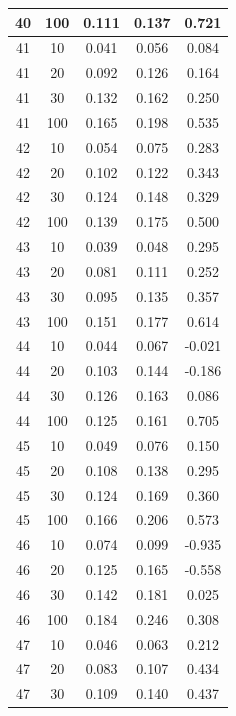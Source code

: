 \begin{longtable}{ |c|c|c|c|c| }
            40 & 100 & 0.111 & 0.137 & 0.721 \\ \hline
            41 & 10 & 0.041 & 0.056 & 0.084 \\ \hline
            41 & 20 & 0.092 & 0.126 & 0.164 \\ \hline
            41 & 30 & 0.132 & 0.162 & 0.250 \\ \hline
            41 & 100 & 0.165 & 0.198 & 0.535 \\ \hline
            42 & 10 & 0.054 & 0.075 & 0.283 \\ \hline
            42 & 20 & 0.102 & 0.122 & 0.343 \\ \hline
            42 & 30 & 0.124 & 0.148 & 0.329 \\ \hline
            42 & 100 & 0.139 & 0.175 & 0.500 \\ \hline
            43 & 10 & 0.039 & 0.048 & 0.295 \\ \hline
            43 & 20 & 0.081 & 0.111 & 0.252 \\ \hline
            43 & 30 & 0.095 & 0.135 & 0.357 \\ \hline
            43 & 100 & 0.151 & 0.177 & 0.614 \\ \hline
            44 & 10 & 0.044 & 0.067 & -0.021 \\ \hline
            44 & 20 & 0.103 & 0.144 & -0.186 \\ \hline
            44 & 30 & 0.126 & 0.163 & 0.086 \\ \hline
            44 & 100 & 0.125 & 0.161 & 0.705 \\ \hline
            45 & 10 & 0.049 & 0.076 & 0.150 \\ \hline
            45 & 20 & 0.108 & 0.138 & 0.295 \\ \hline
            45 & 30 & 0.124 & 0.169 & 0.360 \\ \hline
            45 & 100 & 0.166 & 0.206 & 0.573 \\ \hline
            46 & 10 & 0.074 & 0.099 & -0.935 \\ \hline
            46 & 20 & 0.125 & 0.165 & -0.558 \\ \hline
            46 & 30 & 0.142 & 0.181 & 0.025 \\ \hline
            46 & 100 & 0.184 & 0.246 & 0.308 \\ \hline
            47 & 10 & 0.046 & 0.063 & 0.212 \\ \hline
            47 & 20 & 0.083 & 0.107 & 0.434 \\ \hline
            47 & 30 & 0.109 & 0.140 & 0.437 \\ \hline

\end{longtable}
